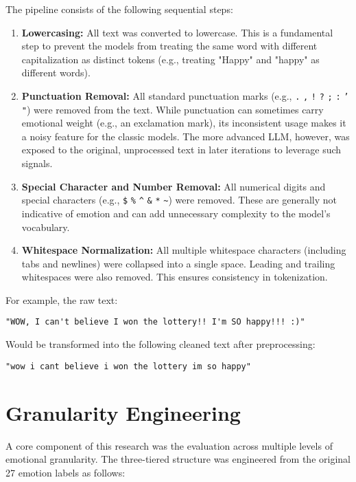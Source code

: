 The pipeline consists of the following sequential steps:
\begin{enumerate}
    \item \textbf{Lowercasing:} All text was converted to lowercase. This is a fundamental step to prevent the models from treating the same word with different capitalization as distinct tokens (e.g., treating "Happy" and "happy" as different words).

    \item \textbf{Punctuation Removal:} All standard punctuation marks (e.g., \texttt{.} \texttt{,} \texttt{!} \texttt{?} \texttt{;} \texttt{:} \texttt{'} \texttt{"}) were removed from the text. While punctuation can sometimes carry emotional weight (e.g., an exclamation mark), its inconsistent usage makes it a noisy feature for the classic models. The more advanced LLM, however, was exposed to the original, unprocessed text in later iterations to leverage such signals.

    \item \textbf{Special Character and Number Removal:} All numerical digits and special characters (e.g., \texttt{\$} \texttt{\%} \texttt{\^} \texttt{\&} \texttt{*} \texttt{\~}) were removed. These are generally not indicative of emotion and can add unnecessary complexity to the model's vocabulary.

    \item \textbf{Whitespace Normalization:} All multiple whitespace characters (including tabs and newlines) were collapsed into a single space. Leading and trailing whitespaces were also removed. This ensures consistency in tokenization.
\end{enumerate}

For example, the raw text:
\begin{verbatim}
"WOW, I can't believe I won the lottery!! I'm SO happy!!! :)"
\end{verbatim}
Would be transformed into the following cleaned text after preprocessing:
\begin{verbatim}
"wow i cant believe i won the lottery im so happy"
\end{verbatim}

\section{Granularity Engineering}

A core component of this research was the evaluation across multiple levels of emotional granularity. The three-tiered structure was engineered from the original 27 emotion labels as follows:

